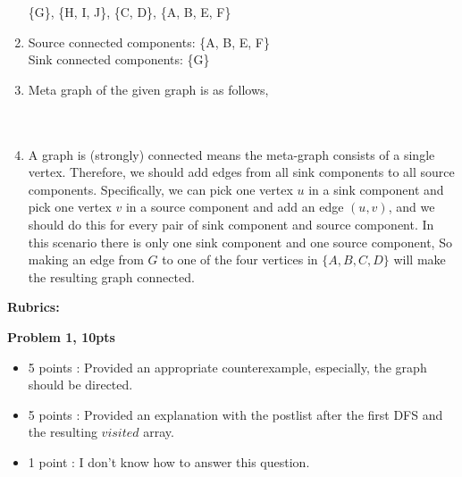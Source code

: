 \documentclass[11pt]{article}
\begin{document}
\begin{qunlist}
\begin{enumerate}
    \{G\}, \{H, I, J\}, \{C, D\}, \{A, B, E, F\}
    \item Source connected components: \{A, B, E, F\}\\
    Sink connected components: \{G\}
    \item Meta graph of the given graph is as follows,\\
    \\\\
	  \item A graph is (strongly) connected means the meta-graph consists of a single vertex.
	  Therefore, we should add edges from all sink components to all source components.
	  Specifically, we can pick one vertex $u$ in a sink component and pick one vertex $v$ in a source component
	  and add an edge $(u,v)$, and we should do this for every pair of sink component and source component.
	  In this scenario there is only one sink component and one source component, So making an edge from
	  $G$ to one of the four vertices in $\{A, B, C, D\}$ will make the resulting graph connected.

\end{enumerate}
    
\newpage
{\huge {\bf Rubrics:}}

\bigskip


{\bf Problem 1, 10pts}
\begin{itemize}
    \item 5 points : Provided an appropriate counterexample, especially, the graph should be directed.
    \item 5 points : Provided an explanation with the postlist after the first DFS and the resulting $visited$ array.
    \item 1 point : I don’t know how to answer this question.
\end{itemize}


\end{qunlist}
\end{document}
